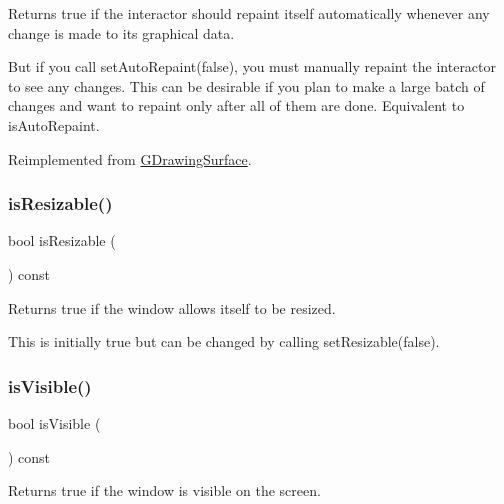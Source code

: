 Returns true if the interactor should repaint itself automatically whenever any change is made to its graphical data. 

But if you call set\+Auto\+Repaint(false), you must manually repaint the interactor to see any changes. This can be desirable if you plan to make a large batch of changes and want to repaint only after all of them are done. Equivalent to is\+Auto\+Repaint. 

Reimplemented from \mbox{\hyperlink{classGDrawingSurface_a82a00267c81cc0ae85ee0feb01a92fa8}{G\+Drawing\+Surface}}.

\mbox{\label{classGWindow_a2afeea3d26d063fa35c104e73275cec7}} 
\subsubsection{\texorpdfstring{is\+Resizable()}{isResizable()}}
{\footnotesize\ttfamily bool is\+Resizable (\begin{DoxyParamCaption}{ }\end{DoxyParamCaption}) const\hspace{0.3cm}{\ttfamily [virtual]}}



Returns true if the window allows itself to be resized. 

This is initially true but can be changed by calling set\+Resizable(false). \mbox{\label{classGWindow_a9d8a6cfb13917785c143e74d40e4e2be}} 
\subsubsection{\texorpdfstring{is\+Visible()}{isVisible()}}
{\footnotesize\ttfamily bool is\+Visible (\begin{DoxyParamCaption}{ }\end{DoxyParamCaption}) const\hspace{0.3cm}{\ttfamily [virtual]}}



Returns true if the window is visible on the screen. 

\mbox{\label{classGWindow_ae2462f15e288c06c5136e31a8ac8151c}} 
